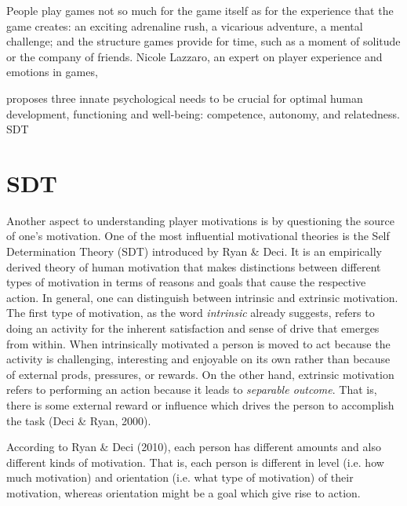 People play games not so much for the game itself as for the experience
that the game creates: an exciting adrenaline rush, a vicarious adventure, a mental challenge;
and the structure games provide for time, such as a moment of solitude or the company of
friends.
Nicole Lazzaro, an expert on player experience and emotions in games, 

proposes three innate psychological needs to be crucial for optimal human development, functioning and well-being: competence, autonomy, and relatedness.%
SDT
\section{SDT}

Another aspect to understanding player motivations is by questioning the source of one's motivation. One of the most influential motivational theories is the Self Determination Theory (SDT) introduced by Ryan \& Deci. It is an empirically derived theory of human motivation that makes distinctions between different types of motivation in terms of reasons and goals that cause the respective action. In general, one can distinguish between intrinsic and extrinsic motivation. The first type of motivation, as the word \textit{intrinsic} already suggests, refers to doing an activity for the inherent satisfaction and sense of drive that emerges from within. When intrinsically
motivated a person is moved to act because the activity is challenging, interesting and enjoyable on its own rather than because of external prods, pressures, or rewards. On the other hand, extrinsic motivation refers to performing an action because it leads to \textit{separable outcome}. That is, there is some external reward or influence which drives the person to accomplish the task (Deci  \& Ryan,  2000). 

According to Ryan \& Deci (2010), each person has different amounts and also different kinds of motivation. That is, each person is different in level (i.e. how much motivation) and orientation (i.e. what type of motivation) of their motivation, whereas orientation might be a goal which give rise to action. 

